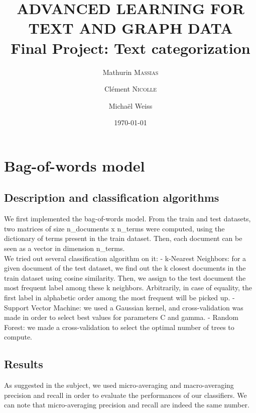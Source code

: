 \documentclass[11pt,a4paper]{article}
\title{ADVANCED LEARNING FOR TEXT AND GRAPH DATA \\ Final Project: Text categorization}
\author{Mathurin \textsc{Massias} \and Clément \textsc{Nicolle} \and Michaël Weiss}
\date{\today}
\begin{document}
	
\maketitle

\section{Bag-of-words model}

\subsection{Description and classification algorithms}

We first implemented the bag-of-words model. From the train and test datasets, two matrices of size n\_documents x n\_terms were computed, using the dictionary of terms present in the train dataset. Then, each document can be seen as a vector in dimension n\_terms.
\\We tried out several classification algorithm on it:
- k-Nearest Neighbors: for a given document of the test dataset, we find out the k closest documents in the train dataset using cosine similarity. Then, we assign to the test document the most frequent label among these k neighbors. Arbitrarily, in case of equality, the first label in alphabetic order among the most frequent will be picked up.
- Support Vector Machine: we used a Gaussian kernel, and cross-validation was made in order to select best values for parameters C and gamma.
- Random Forest: we made a cross-validation to select the optimal number of trees to compute.

\subsection{Results}

As suggested in the subject, we used micro-averaging and macro-averaging precision and recall in order to evaluate the performances of our classifiers. We can note that micro-averaging precision and recall are indeed the same number.
\end{document}

